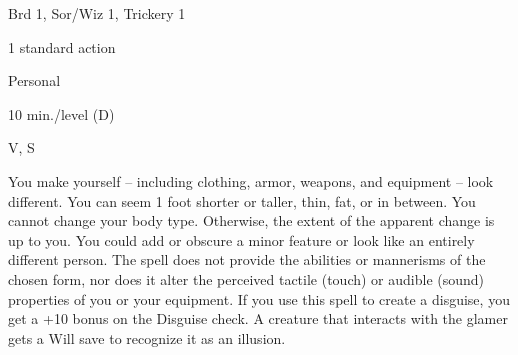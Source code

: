 
\begin{description*}
\item[Level:] Brd 1, Sor/Wiz 1, Trickery 1
\item[Casting Time:] 1 standard action
\item[Range:] Personal
\item[Duration:] 10 min./level (D)
\item[Components:] V, S
\end{description*}

You make yourself -- including clothing, armor, weapons, and equipment -- look different.
You can seem 1 foot shorter or taller, thin, fat, or in between. You cannot change
your body type. Otherwise, the extent of the apparent change is up to you. You
could add or obscure a minor feature or look like an entirely different person.
The spell does not provide the abilities or mannerisms of the chosen form, nor
does it alter the perceived tactile (touch) or audible (sound) properties of you
or your equipment.
If you use this spell to create a disguise, you get a +10 bonus on the Disguise
check.
A creature that interacts with the glamer gets a Will save to recognize it as an
illusion.